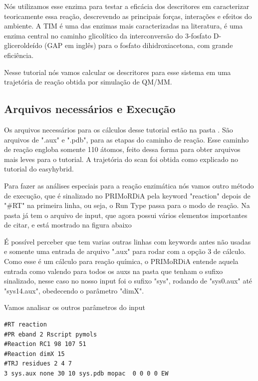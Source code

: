 \documentclass[a4paper,11pt]{refart}
\begin{document}
Nós utilizamos esse enzima para testar a eficácia dos descritores em caracterizar teoricamente essa reação, descrevendo as principais forças, interações e efeitos do ambiente. A TIM é uma das enzimas mais caracterizadas na literatura, é uma enzima central no caminho glicolítico da interconversão do 3-fosfato D-gliceroldeído (GAP em inglês) para o fosfato dihidroxiacetona, com grande eficiência.

Nesse tutorial nós vamos calcular os descritores para esse sistema em uma trajetória de reação obtida por simulação de QM/MM.

\subsection{Arquivos necessários e Execução}

Os arquivos necessários para os cálculos desse tutorial estão na pasta . São arquivos de ".aux" e ".pdb", para as etapas do caminho de reação. Esse caminho de reação engloba somente 110 átomos, feito dessa forma para obter arquivos mais leves para o tutorial. A trajetória do scan foi obtida como explicado no tutorial do easyhybrid.

Para fazer as análises especiais para a reação enzimática nós vamos outro método de execução, que é sinalizado no PRIMoRDiA pela keyword "reaction" depois de "\#RT" na primeira linha, ou seja, o Run Type passa para o modo de reação. Na pasta já tem o arquivo de input, que agora possui vários elementos importantes de citar, e está mostrado na figura abaixo

É possível perceber que tem varias outras linhas com keywords antes não usadas e somente uma entrada de arquivo ".aux" para rodar com a opção 3 de cálculo. Como esse é um cálculo para reação química, o PRIMoRDiA entende aquela entrada como valendo para todos os auxs na pasta que tenham o sufixo sinalizado, nesse caso no nosso input foi o sufixo "sys", rodando de "sys0.aux" até "sys14.aux", obedecendo o parâmetro "dimX".

Vamos analisar os outros parâmetros do input

\hspace*{-\leftmarginwidth}
\begin{minipage}{\fullwidth}
\begin{lstlisting}[caption={Input editado para execução do tutorial 3},label={tut402}]
#RT reaction 
#PR eband 2 Rscript pymols
#Reaction RC1 98 107 51
#Reaction dimX 15
#TRJ residues 2 4 7
3 sys.aux none 30 10 sys.pdb mopac  0 0 0 0 EW
\end{lstlisting}
\end{minipage}
\end{document}
